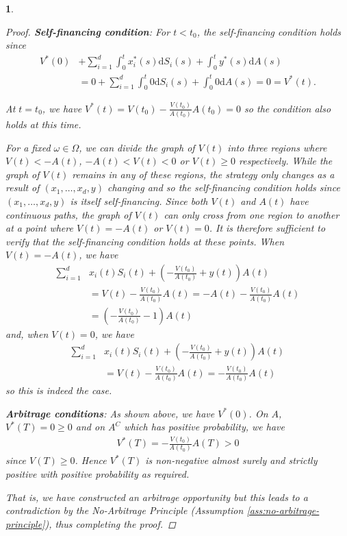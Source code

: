 \documentclass[english]{article}
\numberwithin{equation}{section}
\numberwithin{figure}{section}
\theoremstyle{bolddescit}
\theoremstyle{definition}
\theoremstyle{definition}
\theoremstyle{plain}
\newtheorem{lemma}[theorem]{\protect\lemmaname}
\theoremstyle{plain}
\theoremstyle{bolddesc}
\theoremstyle{plain}
\theoremstyle{remark}
\providecommand{\lemmaname}{Lemma}
\begin{document}
\begin{lemma}
\begin{proof}
    \textbf{Self-financing condition}:
      For $t < t_0$, the self-financing condition holds since
      \begin{align*}
      V^*(0) &+ \sum_{i=1}^d \int_0^t x_i^*(s)\mathrm{d}S_i(s) + \int_0^t y^*(s) \mathrm{d}A(s)\\
      &= 0 + \sum_{i=1}^d \int_0^t 0 \mathrm{d}S_i(s) + \int_0^t 0 \mathrm{d}A(s)
      = 0 = V^*(t).
      \end{align*}

      At $t = t_0$, we have $V^*(t) = V(t_0) - \frac{V(t_0)}{A(t_0)} A(t_0) = 0$ so the condition also holds at this time.

      For a fixed $\omega \in \Omega$, we can divide the graph of $V(t)$ into three regions where $V(t) < -A(t)$, $-A(t) < V(t) < 0$ or $V(t) \ge 0$ respectively. While the graph of $V(t)$ remains in any of these regions, the strategy only changes as a result of $(x_1,\ldots,x_d,y)$ changing and so the self-financing condition holds since $(x_1,\ldots,x_d,y)$ is itself self-financing. Since both $V(t)$ and $A(t)$ have continuous paths, the graph of $V(t)$ can only cross from one region to another at a point where $V(t) = -A(t)$ or $V(t) = 0$. It is therefore sufficient to verify that the self-financing condition holds at these points. When $V(t) = -A(t)$, we have
      \begin{align*}
        \sum_{i=1}^{d} &x_i(t) S_i(t) + \left(- \frac{V(t_0)}{A(t_0)} + y(t)\right) A(t)\\
        &= V(t) - \frac{V(t_0)}{A(t_0)} A(t) = -A(t) - \frac{V(t_0)}{A(t_0)} A(t)\\
        &= \left(- \frac{V(t_0)}{A(t_0)} - 1\right) A(t)
      \end{align*}
      and, when $V(t) = 0$, we have
      \begin{align*}
        \sum_{i=1}^{d} &x_i(t) S_i(t) + \left(- \frac{V(t_0)}{A(t_0)} + y(t)\right) A(t)\\
        &= V(t) - \frac{V(t_0)}{A(t_0)} A(t) = - \frac{V(t_0)}{A(t_0)} A(t)
      \end{align*}
      so this is indeed the case.

    \textbf{Arbitrage conditions}: As shown above, we have $V^*(0)$. On $A$, $V^*(T) = 0 \ge 0$ and on $A^C$ which has positive probability, we have
    \begin{align*}
      V^*(T) = -\frac{V(t_0)}{A(t_0)} A(T) > 0
    \end{align*}
    since $V(T) \ge 0$. Hence $V^*(T)$ is non-negative almost surely and strictly positive with positive probability as required.

    That is, we have constructed an arbitrage opportunity but this leads to a contradiction by the No-Arbitrage Principle (Assumption \ref{ass:no-arbitrage-principle}), thus completing the proof.
  \end{proof}
\end{lemma}
\end{document}
